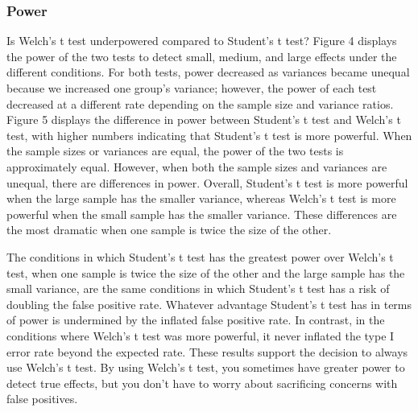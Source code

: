 \documentclass[man,a4paper,noextraspace,apacite]{apa6}
\begin{document}
\subsubsection{Power}



    Is Welch's t test underpowered compared to Student's t test? Figure 4 displays the power of the two tests to detect small, medium, and large effects under the different conditions. For both tests, power decreased as variances became unequal because we increased one group's variance; however, the power of each test decreased at a different rate depending on the sample size and variance ratios. Figure 5 displays the difference in power between Student's t test and Welch's t test, with higher numbers indicating that Student's t test is more powerful. When the sample sizes or variances are equal, the power of the two tests is approximately equal. However, when both the sample sizes and variances are unequal, there are differences in power. Overall, Student's t test is more powerful when the large sample has the smaller variance, whereas Welch's t test is more powerful when the small sample has the smaller variance. These differences are the most dramatic when one sample is twice the size of the other. 
    
    The conditions in which Student's t test has the greatest power over Welch's t test, when one sample is twice the size of the other and the large sample has the small variance, are the same conditions in which Student's t test has a risk of doubling the false positive rate. Whatever advantage Student's t test has in terms of power is undermined by the inflated false positive rate. In contrast, in the conditions where Welch's t test was more powerful, it never inflated the type I error rate beyond the expected rate. These results support the decision to always use Welch's t test. By using Welch's t test, you sometimes have greater power to detect true effects, but you don't have to worry about sacrificing concerns with false positives.  
\end{document}
